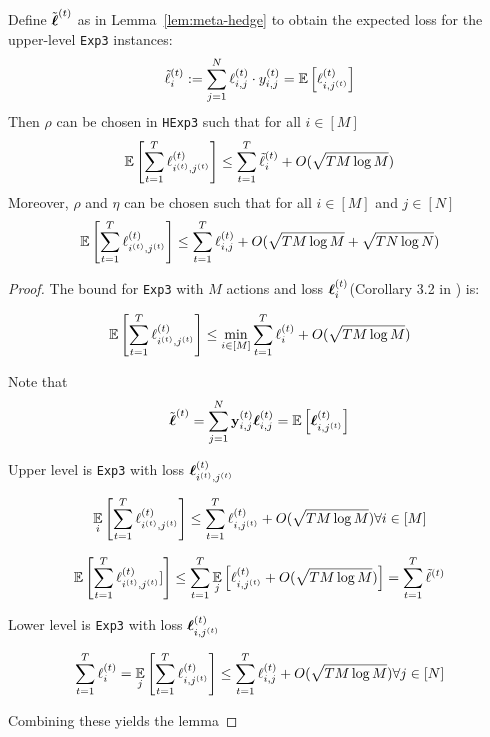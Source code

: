 \begin{lem}\label{lem:meta-exp}
	Define $\tilde{\boldsymbol\ell}^{(t)}$ as in Lemma~\ref{lem:meta-hedge} to obtain the expected loss for the upper-level \texttt{Exp3} instances:
	$$\tilde{\ell}^{(t)}_i := \sum_{j=1}^N \ell^{(t)}_{i,j}\cdot y^{(t)}_{i,j} = \operatorname*{\mathbb E}\left[ \ell^{(t)}_{i,j^{(t)}}\right]$$
	Then $\rho$ can be chosen in \texttt{HExp3} such that for all $i\in[M]$
	\begin{equation}
		\operatorname*{\mathbb E}\left[\sum_{t=1}^T\ell^{(t)}_{i^{(t)},j^{(t)}}\right]
		\leq \sum_{t=1}^T \tilde{\ell}^{(t)}_{i}
		+ O(\sqrt{T M\log M})
	\end{equation}
	Moreover, $\rho$ and $\eta$ can be chosen such that for all $i\in[M]$ and $j\in[N]$
	\begin{equation}
		\operatorname*{\mathbb E}\left[\sum_{t=1}^{T} \ell^{(t)}_{i^{(t)},j^{(t)}}\right]
		\leq \sum_{t=1}^T\ell^{(t)}_{i,j}
		+ O(\sqrt{TM \log M} + \sqrt{T N\log N})
	\end{equation}
\end{lem}

\begin{proof}
 The bound for \texttt{Exp3} with $M$ actions and loss $\boldsymbol\ell^{(t)}_i$(Corollary 3.2 in \cite{auer:02b}) is:
 
 \begin{equation}
 	\operatorname*{\mathbb E}\left[\sum_{t=1}^T\ell^{(t)}_{i^{(t)},j^{(t)}}\right]
    \leq \min_{i\in[M]} \sum_{t=1}^T \ell^{(t)}_i + O(\sqrt{T M \log M})
 \end{equation}
 
 Note that
  \begin{equation}
 \tilde{\boldsymbol\ell}^{(t)} =   \sum_{j=1}^N {\mathbf y}^{(t)}_{i,j} \boldsymbol\ell^{(t)}_{i,j} = \operatorname*{\mathbb E}\left[ \boldsymbol\ell^{(t)}_{i,j^{(t)}}  \right]
  \end{equation}

Upper level is \texttt{Exp3}  with loss $\boldsymbol\ell^{(t)}_{i^{(t)},j^{(t)}} $ 


\begin{equation}
\operatorname*{\mathbb E}_i \left[\sum_{t=1}^T\ell^{(t)}_{i^{(t)},j^{(t)}}\right]
\leq \sum_{t=1}^T\ell^{(t)}_{i,j^{(t)}} +  O(\sqrt{T M \log M}) \forall i \in [M]
\end{equation}

\begin{equation}
\operatorname*{\mathbb E} \left[\sum_{t=1}^T\ell^{(t)}_{i^{(t)},j^{(t)}}]\right]
\leq \sum_{t=1}^T \operatorname*{\mathbb E}_j \left[ \ell^{(t)}_{i,j^{(t)}} +  O(\sqrt{T M \log M}) \right]  = \sum_{t=1}^T\tilde{\ell}^{(t)}
\end{equation}

Lower level is \texttt{Exp3} with loss $\boldsymbol\ell^{(t)}_{i,j^{(t)}} $ 


\begin{equation}
\sum_{t=1}^T\ell^{(t)}_{i} = \operatorname*{\mathbb E}_j \left[\sum_{t=1}^T\ell^{(t)}_{i,j^{(t)}}\right] 
 \leq \sum_{t=1}^T\ell^{(t)}_{i,j} +  O(\sqrt{T M \log M}) \forall j \in [N]
\end{equation}

Combining these yields the lemma

\end{proof}


